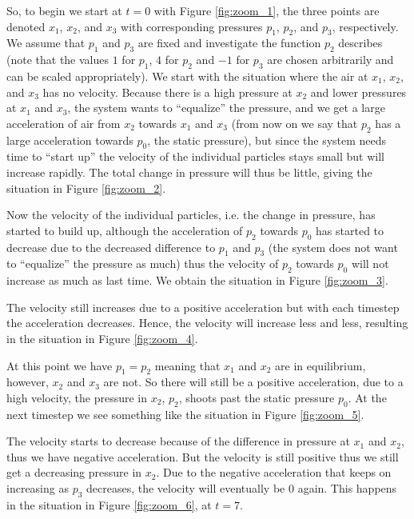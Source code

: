 So, to begin we start at $t=0$ with Figure \ref{fig:zoom_1}, the three points are denoted $x_1$, $x_2$, and $x_3$ with corresponding pressures $p_1$, $p_2$, and $p_3$, respectively.
We assume that $p_1$ and $p_3$ are fixed and investigate the function $p_2$ describes (note that the values $1$ for $p_1$, $4$ for $p_2$ and $-1$ for $p_3$ are chosen arbitrarily and can be scaled appropriately).
We start with the situation where the air at $x_1$, $x_2$, and $x_3$ has no velocity.
Because there is a high pressure at $x_2$ and lower pressures at $x_1$ and $x_3$, the system wants to ``equalize'' the pressure, and we get a large acceleration of air from $x_2$ towards $x_1$ and $x_3$ (from now on we say that $p_2$ has a large acceleration towards $p_0$, the static pressure), but since the system needs time to ``start up'' the velocity of the individual particles stays small but will increase rapidly. The total change in pressure will thus be little, giving the situation in Figure \ref{fig:zoom_2}.

Now the velocity of the individual particles, i.e. the change in pressure, has started to build up, although the acceleration of $p_2$ towards $p_0$ has started to decrease due to the decreased difference to $p_1$ and $p_3$ (the system does not want to ``equalize'' the pressure as much) thus the velocity of $p_2$ towards $p_0$ will not increase as much as last time. We obtain the situation in Figure \ref{fig:zoom_3}.

The velocity still increases due to a positive acceleration but with each timestep the acceleration decreases. Hence, the velocity will increase less and less, resulting in the situation in Figure \ref{fig:zoom_4}.

At this point we have $p_1=p_2$ meaning that $x_1$ and $x_2$ are in equilibrium, however, $x_2$ and $x_3$ are not. So there will still be a positive acceleration, due to a high velocity, the pressure in $x_2$, $p_2$, shoots past the static pressure $p_0$. At the next timestep we see something like the situation in Figure \ref{fig:zoom_5}.

The velocity starts to decrease because of the difference in pressure at $x_1$ and $x_2$, thus we have negative acceleration. But the velocity is still positive thus we still get a decreasing pressure in $x_2$. Due to the negative acceleration that keeps on increasing as $p_3$ decreases, the velocity will eventually be 0 again. This happens in the situation in Figure \ref{fig:zoom_6}, at $t=7$.

